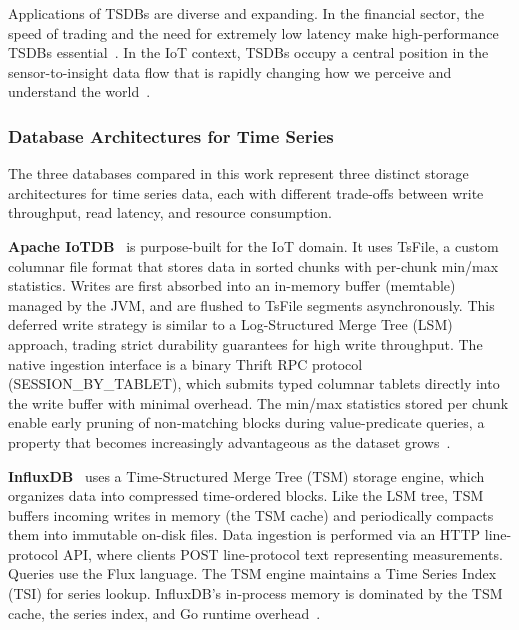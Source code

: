Applications of TSDBs are diverse and expanding. In the financial sector, the speed of trading
and the need for extremely low latency make high-performance TSDBs essential~\cite{Dunning2014}.
In the IoT context, TSDBs occupy a central position in the sensor-to-insight data flow that is
rapidly changing how we perceive and understand the world~\cite{Dunning2014}.

\subsubsection{Database Architectures for Time Series}

The three databases compared in this work represent three distinct storage architectures for
time series data, each with different trade-offs between write throughput, read latency, and
resource consumption.

\textbf{Apache IoTDB}~\cite{wang2023iotdb} is purpose-built for the IoT domain. It uses TsFile,
a custom columnar file format that stores data in sorted chunks with per-chunk min/max statistics.
Writes are first absorbed into an in-memory buffer (memtable) managed by the JVM, and are
flushed to TsFile segments asynchronously. This deferred write strategy is similar to a
Log-Structured Merge Tree (LSM) approach, trading strict durability guarantees for high
write throughput. The native ingestion interface is a binary Thrift RPC protocol
(SESSION\_BY\_TABLET), which submits typed columnar tablets directly into the write buffer
with minimal overhead. The min/max statistics stored per chunk enable early pruning of
non-matching blocks during value-predicate queries, a property that becomes increasingly
advantageous as the dataset grows~\cite{wang2023iotdb}.

\textbf{InfluxDB}~\cite{naqvi2017influxdb} uses a Time-Structured Merge Tree (TSM) storage
engine, which organizes data into compressed time-ordered blocks. Like the LSM tree, TSM
buffers incoming writes in memory (the TSM cache) and periodically compacts them into
immutable on-disk files. Data ingestion is performed via an HTTP line-protocol API, where
clients POST line-protocol text representing measurements. Queries use the Flux language.
The TSM engine maintains a Time Series Index (TSI) for series lookup. InfluxDB's in-process
memory is dominated by the TSM cache, the series index, and Go runtime overhead~\cite{naqvi2017influxdb}.

